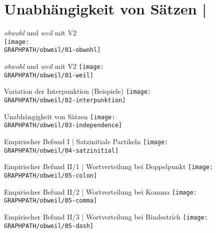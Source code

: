 \section[Unabhängigkeit]{Unabhängigkeit von Sätzen | \citet{SchaeferSayatz2016}}


\begin{frame}
  {\textit{obwohl} und \textit{weil} mit V2}
  \citet{SchaeferSayatz2016}\\
  \Zeile
  \centering 
  \texttt{[image: \\GRAPHPATH/obweil/01-obwohl]}
\end{frame}

\begin{frame}
  {\textit{obwohl} und \textit{weil} mit V2}
  \centering 
  \texttt{[image: \\GRAPHPATH/obweil/01-weil]}
\end{frame}

\begin{frame}
  {Variation der Interpunktion (Beispiele)}
  \centering 
  \texttt{[image: \\GRAPHPATH/obweil/02-interpunktion]}
\end{frame}

\begin{frame}
  {Unabhängigkeit von Sätzen}
  \centering 
  \texttt{[image: \\GRAPHPATH/obweil/03-independence]} 
\end{frame}

\begin{frame}
  {Empirischer Befund I | Satzinitiale Partikeln}
  \centering 
  \texttt{[image: \\GRAPHPATH/obweil/04-satzinitial]}
\end{frame}

\begin{frame}
  {Empirischer Befund II/1 | Wortverteilung bei Doppelpunkt}
  \centering 
  \texttt{[image: \\GRAPHPATH/obweil/05-colon]}
\end{frame}

\begin{frame}
  {Empirischer Befund II/2 | Wortverteilung bei Komma}
  \centering 
  \texttt{[image: \\GRAPHPATH/obweil/05-comma]}
\end{frame}

\begin{frame}
  {Empirischer Befund II/3 | Wortverteilung bei Bindestrich}
  \centering 
  \texttt{[image: \\GRAPHPATH/obweil/05-dash]}
\end{frame}

